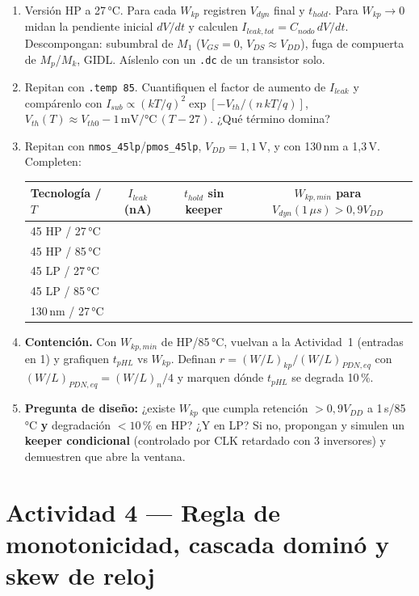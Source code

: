 \documentclass[11pt,a4paper]{article}
\begin{document}
\begin{tarea}
\begin{enumerate}[nosep,leftmargin=*]
\item Versión HP a 27\,°C. Para cada $W_{kp}$ registren $V_{dyn}$ final y $t_{hold}$. Para $W_{kp}\to0$ midan la pendiente inicial $dV/dt$ y calculen $I_{leak,tot}=C_{nodo}\,dV/dt$. Descompongan: subumbral de $M_1$ ($V_{GS}=0$, $V_{DS}\approx V_{DD}$), fuga de compuerta de $M_p$/$M_k$, GIDL. Aíslenlo con un \texttt{.dc} de un transistor solo.
\item Repitan con \texttt{.temp 85}. Cuantifiquen el factor de aumento de $I_{leak}$ y compárenlo con $I_{sub}\propto (kT/q)^2\exp[-V_{th}/(n\,kT/q)]$, $V_{th}(T)\approx V_{th0}-1\,\mathrm{mV/°C}\,(T-27)$. ¿Qué término domina?
\item Repitan con \texttt{nmos\_45lp}/\texttt{pmos\_45lp}, $V_{DD}=1{,}1$\,V, y con 130\,nm a 1{,}3\,V. Completen:
\begin{center}\small
\begin{tabular}{@{}lccc@{}}
\toprule
\textbf{Tecnología / $T$} & $I_{leak}$ (nA) & $t_{hold}$ sin keeper & $W_{kp,min}$ para $V_{dyn}(1\,\mu s)>0{,}9V_{DD}$\\
\midrule
45 HP / 27\,°C &&&\\
45 HP / 85\,°C &&&\\
45 LP / 27\,°C &&&\\
45 LP / 85\,°C &&&\\
130\,nm / 27\,°C &&&\\
\bottomrule
\end{tabular}
\end{center}
\item \textbf{Contención.} Con $W_{kp,min}$ de HP/85\,°C, vuelvan a la Actividad~1 (entradas en 1) y grafiquen $t_{pHL}$ vs $W_{kp}$. Definan $r=(W/L)_{kp}/(W/L)_{PDN,eq}$ con $(W/L)_{PDN,eq}=(W/L)_n/4$ y marquen dónde $t_{pHL}$ se degrada 10\,\%.
\item \textbf{Pregunta de diseño:} ¿existe $W_{kp}$ que cumpla retención $>0{,}9V_{DD}$ a 1\,\textmu s/85\,°C \textbf{y} degradación $<10$\,\% en HP? ¿Y en LP? Si no, propongan y simulen un \textbf{keeper condicional} (controlado por CLK retardado con 3 inversores) y demuestren que abre la ventana.
\end{enumerate}
\end{tarea}

\section{Actividad 4 — Regla de monotonicidad, cascada dominó y skew de reloj}
\end{document}
